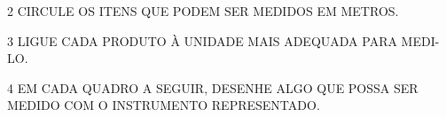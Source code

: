 \num{2} CIRCULE OS ITENS QUE PODEM SER MEDIDOS EM METROS.



\num{3} LIGUE CADA PRODUTO À UNIDADE MAIS ADEQUADA PARA MEDI-LO.



\num{4} EM CADA QUADRO A SEGUIR, DESENHE ALGO QUE POSSA SER MEDIDO COM O INSTRUMENTO REPRESENTADO.


